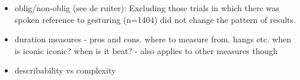 \documentclass[a4paper,man,natbib]{apa6}
\newcommand\blankpage{%
    \null
    \thispagestyle{empty}%
    \addtocounter{page}{-1}%
    \newpage}
\begin{document}
\begin{itemize}
\item oblig/non-oblig (see de ruiter): Excluding those trials in which there was spoken reference to gesturing (n=1404) did not change the pattern of results. 
\item duration measures - pros and cons. where to measure from. hangs etc. when is iconic iconic? when is it beat? - also applies to other measures though
\item describability vs complexity
\end{itemize}


\afterpage{\blankpage}


\end{document}
